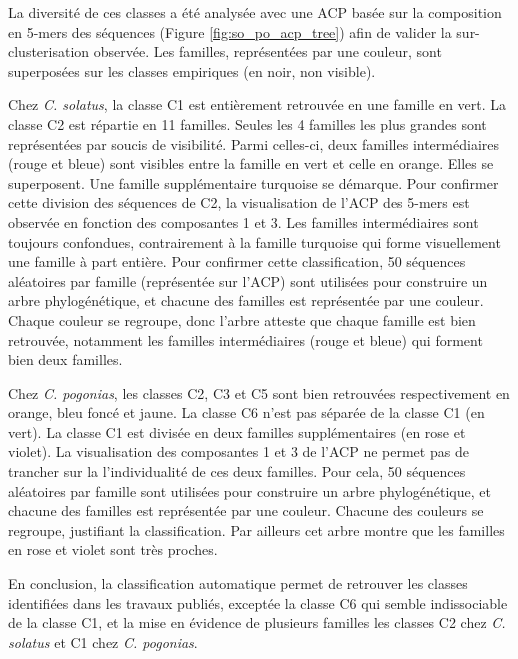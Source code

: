 \documentclass[12pt,a4paper]{article}
\begin{document}
			La diversité de ces classes a été analysée avec une ACP basée sur la composition en 5-mers des séquences (Figure \ref{fig:so_po_acp_tree}) afin de valider la sur-clusterisation observée. Les familles, représentées par une couleur, sont superposées sur les classes empiriques (en noir, non visible).
			
			  Chez \textit{C. solatus}, la classe C1 est entièrement retrouvée en une famille en vert. La classe C2 est répartie en 11 familles. Seules les 4 familles les plus grandes sont représentées par soucis de visibilité. Parmi celles-ci, deux familles intermédiaires (rouge et bleue) sont visibles entre la famille en vert  et  celle en orange. Elles se superposent.  Une famille supplémentaire turquoise se démarque. Pour confirmer cette division des séquences de C2, la visualisation de l'ACP des 5-mers est observée en fonction des composantes 1 et 3. Les familles intermédiaires sont toujours confondues, contrairement à la famille turquoise qui forme visuellement une famille à part entière. Pour confirmer cette classification, 50 séquences aléatoires par famille (représentée sur l'ACP) sont utilisées pour construire un arbre phylogénétique, et chacune des familles est représentée par une couleur. Chaque couleur se regroupe, donc l'arbre atteste que chaque famille est bien retrouvée, notamment les familles intermédiaires (rouge et bleue) qui forment bien deux familles. 
			  
			  Chez \textit{C. pogonias}, les classes C2, C3 et C5 sont bien retrouvées respectivement en orange, bleu foncé et jaune. La classe C6 n'est pas séparée de la classe C1 (en vert). La classe C1 est divisée en deux familles supplémentaires (en rose et violet). La visualisation des composantes 1 et 3 de l'ACP ne permet pas de trancher sur la l'individualité de ces deux familles. Pour cela, 50 séquences aléatoires par famille sont utilisées pour construire un arbre phylogénétique, et chacune des familles est représentée par une couleur. Chacune des couleurs se regroupe, justifiant la classification. Par ailleurs cet arbre montre que les familles en rose et violet sont très proches.
			
			En conclusion, la classification automatique permet de retrouver les classes identifiées dans les travaux publiés, exceptée la classe C6 qui semble indissociable de la classe C1, et la mise en évidence de plusieurs familles les classes C2 chez \textit{C. solatus} et C1 chez \textit{C. pogonias}.
			 
\end{document}
